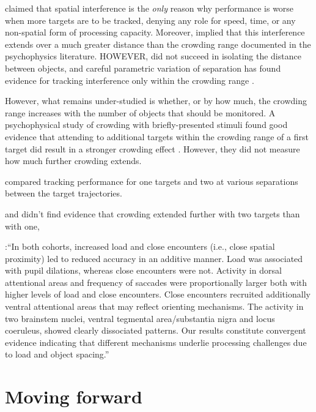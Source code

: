 \documentclass[]{book}
\begin{document}
\citet{franconeriTrackingMultipleObjects2010a} claimed that spatial interference is the \emph{only} reason why performance is worse when more targets are to be tracked, denying any role for speed, time, or any non-spatial form of processing capacity. Moreover, \citet{franconeriTrackingMultipleObjects2010a} implied that this interference extends over a much greater distance than the crowding range documented in the psychophysics literature. HOWEVER, \citet{franconeriTrackingMultipleObjects2010a} did not succeed in isolating the distance between objects, and careful parametric variation of separation has found evidence for tracking interference only within the crowding range \citep{holcombeObjectTrackingAbsence2014, holcombeExhaustingAttentionalTracking2012}.

However, what remains under-studied is whether, or by how much, the crowding range increases with the number of objects that should be monitored. A psychophysical study of crowding with briefly-presented stimuli found good evidence that attending to additional targets within the crowding range of a first target did result in a stronger crowding effect \citep{mareschalAttentionalModulationCrowding2010}. However, they did not measure how much further crowding extends.

\citet{holcombeObjectTrackingAbsence2014} compared tracking performance for one targets and two at various separations between the target trajectories.

and didn't find evidence that crowding extended further with two targets than with one,

\citet{maki-marttunenDistinctNeuralMechanisms2019}:``In both cohorts, increased load and close encounters (i.e., close spatial proximity) led to reduced accuracy in an additive manner. Load was associated with pupil dilations, whereas close encounters were not. Activity in dorsal attentional areas and frequency of saccades were proportionally larger both with higher levels of load and close encounters. Close encounters recruited additionally ventral attentional areas that may reflect orienting mechanisms. The activity in two brainstem nuclei, ventral tegmental area/substantia nigra and locus coeruleus, showed clearly dissociated patterns. Our results constitute convergent evidence indicating that different mechanisms underlie processing challenges due to load and object spacing.''

\hypertarget{moving-forward-1}{%
\section{Moving forward}\label{moving-forward-1}}
\end{document}
